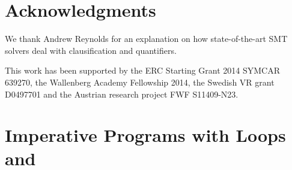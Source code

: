 \section*{Acknowledgments}
\label{sec:newcnf/acknowledgments}
We thank Andrew Reynolds for an explanation on how state-of-the-art SMT solvers deal with clausification and quantifiers. 

This work has been supported by the ERC Starting Grant 2014 SYMCAR 639270, the Wallenberg Academy Fellowship 2014, the Swedish VR grant D0497701 and the Austrian research project FWF S11409-N23.


\newpage
\section{Imperative Programs with Loops and \ITE}
\label{sec:newcnf/examples}

